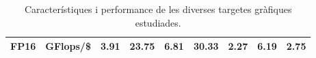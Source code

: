 \begin{table}[]
\begin{adjustwidth}{-1.0in}{-1.0in}
\begin{center}
{\begin{tabular}{cc||c|c|c|c|c|c|c}
\multirow{-3}{*}{FP16}            & GFlops/\$                                                                              & 3.91                                                            & 23.75                                                            & 6.81                                                                 & 30.33                                                         & 2.27                                                                 & 6.19                                                                   & 2.75 \\ \hline
\end{tabular}
    }
\end{center}
\end{adjustwidth}
    \caption{Característiques i performance de les diverses targetes gràfiques estudiades.}
    \label{tab:gpu_specs}
\end{table}
